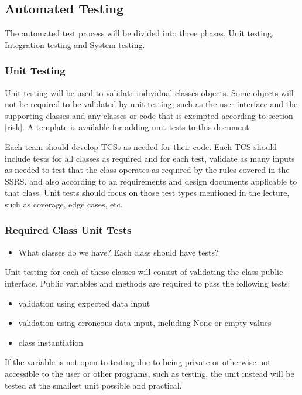 \documentclass[report]{article}
\begin{document}
\subsection{Automated Testing}
The automated test process will be divided into three phases, Unit testing, Integration testing and System testing.

\subsubsection{Unit Testing}
Unit testing will be used to validate individual classes objects. Some objects will not be required to be validated by unit testing, such as the user interface and the supporting classes and any classes or code that is exempted according to section \ref{risk}. A template is available for adding unit tests to this document.

Each team should develop TCSs as needed for their code. Each TCS should include tests for all classes as required and for each test, validate as many inputs as needed to test that the class operates as required by the rules covered in the SSRS, and also according to an requirements and design documents applicable to that class. Unit tests should focus on those test types mentioned in the lecture, such as coverage, edge cases, etc.

\subsubsection{Required Class Unit Tests}
\begin{itemize}
\item What classes do we have? Each class should have tests?
\end{itemize}
Unit testing for each of these classes will consist of validating the class public interface. Public variables and methods are required to pass the following tests:
\begin{itemize}
\item validation using expected data input
\item validation using erroneous data input, including None or empty values
\item class instantiation
\end{itemize}

If the variable is not open to testing due to being private or otherwise not accessible to the user or other programs, such as testing, the unit instead will be tested at the smallest unit possible and practical.
\end{document}
